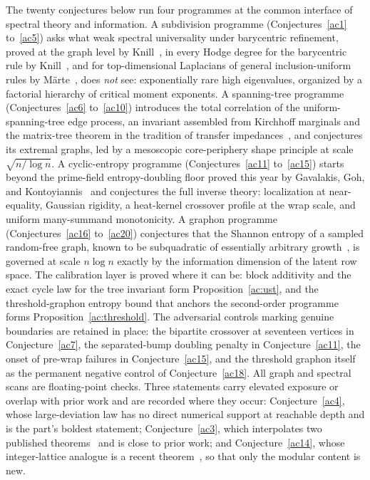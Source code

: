 \documentclass[11pt]{article}
\theoremstyle{definition}
\begin{document}
The twenty conjectures below run four programmes at the common interface of spectral theory and information.  A subdivision programme (Conjectures~\ref{ac1} to~\ref{ac5}) asks what weak spectral universality under barycentric refinement, proved at the graph level by Knill~\cite{Kn15a,Kn15b}, in every Hodge degree for the barycentric rule by Knill~\cite{Kn17}, and for top-dimensional Laplacians of general inclusion-uniform rules by M\"arte~\cite{Mar22}, does \emph{not} see: exponentially rare high eigenvalues, organized by a factorial hierarchy of critical moment exponents.  A spanning-tree programme (Conjectures~\ref{ac6} to~\ref{ac10}) introduces the total correlation of the uniform-spanning-tree edge process, an invariant assembled from Kirchhoff marginals and the matrix-tree theorem in the tradition of transfer impedances~\cite{BP93}, and conjectures its extremal graphs, led by a mesoscopic core-periphery shape principle at scale $\sqrt{n/\log n}$.  A cyclic-entropy programme (Conjectures~\ref{ac11} to~\ref{ac15}) starts beyond the prime-field entropy-doubling floor proved this year by Gavalakis, Goh, and Kontoyiannis~\cite{GGK26} and conjectures the full inverse theory: localization at near-equality, Gaussian rigidity, a heat-kernel crossover profile at the wrap scale, and uniform many-summand monotonicity.  A graphon programme (Conjectures~\ref{ac16} to~\ref{ac20}) conjectures that the Shannon entropy of a sampled random-free graph, known to be subquadratic of essentially arbitrary growth~\cite{HN13}, is governed at scale $n\log n$ exactly by the information dimension of the latent row space.  The calibration layer is proved where it can be: block additivity and the exact cycle law for the tree invariant form Proposition~\ref{ac:ust}, and the threshold-graphon entropy bound that anchors the second-order programme forms Proposition~\ref{ac:threshold}.  The adversarial controls marking genuine boundaries are retained in place: the bipartite crossover at seventeen vertices in Conjecture~\ref{ac7}, the separated-bump doubling penalty in Conjecture~\ref{ac11}, the onset of pre-wrap failures in Conjecture~\ref{ac15}, and the threshold graphon itself as the permanent negative control of Conjecture~\ref{ac18}.  All graph and spectral scans are floating-point checks.  Three statements carry elevated exposure or overlap with prior work and are recorded where they occur: Conjecture~\ref{ac4}, whose large-deviation law has no direct numerical support at reachable depth and is the part's boldest statement; Conjecture~\ref{ac3}, which interpolates two published theorems~\cite{Mar22,Kn17} and is close to prior work; and Conjecture~\ref{ac14}, whose integer-lattice analogue is a recent theorem~\cite{CS25}, so that only the modular content is new.
\end{document}
